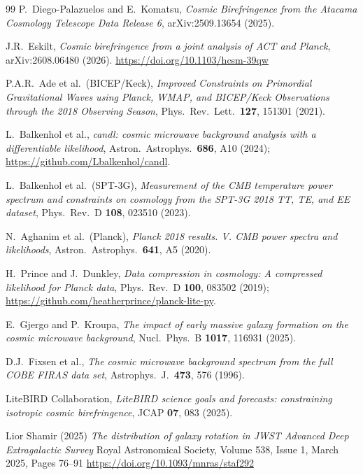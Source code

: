 \documentclass[11pt,a4paper]{article}
\theoremstyle{plain}
\theoremstyle{definition}
\begin{document}
\begin{thebibliography}{99}
P.~Diego-Palazuelos and E.~Komatsu,
\emph{Cosmic Birefringence from the Atacama Cosmology Telescope Data
Release 6},
arXiv:2509.13654 (2025).

J.R.~Eskilt,
\emph{Cosmic birefringence from a joint analysis of ACT and Planck},
arXiv:2608.06480 (2026). \url{https://doi.org/10.1103/hcsm-39qw}

P.A.R.~Ade et al.\ (BICEP/Keck),
\emph{Improved Constraints on Primordial Gravitational Waves using
Planck, WMAP, and BICEP/Keck Observations through the 2018 Observing
Season},
Phys.\ Rev.\ Lett.\ \textbf{127}, 151301 (2021).

L.~Balkenhol et al.,
\emph{candl: cosmic microwave background analysis with a differentiable
likelihood},
Astron.\ Astrophys.\ \textbf{686}, A10 (2024);
\url{https://github.com/Lbalkenhol/candl}.

L.~Balkenhol et al.\ (SPT-3G),
\emph{Measurement of the CMB temperature power spectrum and constraints
on cosmology from the SPT-3G 2018 TT, TE, and EE dataset},
Phys.\ Rev.\ D \textbf{108}, 023510 (2023).

N.~Aghanim et al.\ (Planck),
\emph{Planck 2018 results. V. CMB power spectra and likelihoods},
Astron.\ Astrophys.\ \textbf{641}, A5 (2020).

H.~Prince and J.~Dunkley,
\emph{Data compression in cosmology: A compressed likelihood for Planck
data},
Phys.\ Rev.\ D \textbf{100}, 083502 (2019);
\url{https://github.com/heatherprince/planck-lite-py}.

E.~Gjergo and P.~Kroupa,
\emph{The impact of early massive galaxy formation on the cosmic
microwave background},
Nucl.\ Phys.\ B \textbf{1017}, 116931 (2025).

D.J.~Fixsen et al.,
\emph{The cosmic microwave background spectrum from the full COBE
FIRAS data set},
Astrophys.\ J.\ \textbf{473}, 576 (1996).

LiteBIRD Collaboration,
\emph{LiteBIRD science goals and forecasts: constraining isotropic
cosmic birefringence},
JCAP \textbf{07}, 083 (2025).

Lior Shamir (2025)
\emph{The distribution of galaxy rotation in JWST Advanced Deep Extragalactic Survey}
Royal Astronomical Society, Volume 538, Issue 1, March 2025, Pages 76–91
\url{https://doi.org/10.1093/mnras/staf292}


\end{thebibliography}
\end{document}
